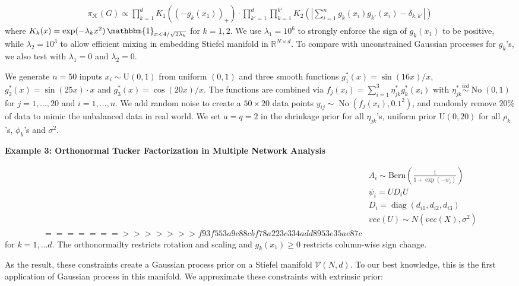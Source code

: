 \documentclass[10pt]{article}
\newcommand{\mc}[1]{\mathcal{#1}}
\DeclareMathOperator{\No}{No}
\DeclareMathOperator{\diag}{diag}
\DeclareMathOperator{\1}{\mathbbm{1}}
\begin{document}
 \begin{equation*}
\begin{aligned}
\pi_{\mc K}(G) \propto   \prod_{k=1}^{d} K_{1}{\left((-g_k(x_1) )_+\right)} \cdot \prod_{k'=1}^{d}\prod_{k=1}^{k'} K_2 ( |\sum_{i=1}^n g_k(x_i) g_{k'}(x_i) - \delta_{k,k'}|)
\end{aligned}
\end{equation*}
where $K_{k}(x)=\exp(- \lambda_k x^2) \1_{x<4/\sqrt{2\lambda_k}}$ for  $k=1,2$. We use $\lambda_1 = 10^6$ to strongly enforce the sign of $g_k(x_1)$ to be positive, while $\lambda_2 = 10^3$ to allow efficient mixing in embedding Stiefel manifold in $\mathbb{R}^{N\times d}$. To compare with unconstrained Gaussian processes for $g_k$'s, we also test with $\lambda_1=0$ and $\lambda_2=0$.

We generate $n=50$ inputs $x_i\sim \text{U}(0,1)$ from uniform $(0,1)$ and three smooth functions $g^*_1(x)= \sin(16 x)/x$, $g^*_2(x)= \sin(25 x)\cdot x$ and $g^*_3(x)= \cos(20 x)/x$. The functions are combined via $f_j(x_i)=\sum_{i=1}^3 \eta^*_{jk} g^*_k(x_i)$ with $\eta^*_{jk}\stackrel{iid}{\sim} \No(0,1)$ for $j=1,\ldots,20$ and $i=1,\ldots,n$. We add random noise to create a $50\times 20$ data points $y_{ij} \sim \No(f_j(x_i),0.1^2)$, and randomly remove $20\%$ of data to mimic the unbalanced data in real world. We set $a=q=2$ in the shrinkage prior for all $\eta_{jk}$'s, uniform prior $\text{U}(0,20)$ for all $\rho_k$'s, $\phi_k$'s and $\sigma^2$.

{\bf Example 3: Orthonormal Tucker Factorization in Multiple Network Analysis}


 \begin{equation*}
\begin{aligned}
& A_i \sim \text{Bern}( \frac{1}{1+ \exp(- \psi_i)})\\
& \psi_i = UD_iU \\
& D_i = \diag(d_{i1},d_{i2},d_{i3}) \\
& vec(U) \sim N (vec (X), \sigma^2)\\
=======
>>>>>>> f93f553a9c88cbf78a223c334add8953e35ae87c
\end{aligned}
\end{equation*}
for $k=1,\ldots d$. The orthonormailty restricts rotation and scaling and $g_k(x_1)\ge 0$ restricts column-wise sign change. 

As the result, these constraints create a Gaussian process prior on a Stiefel manifold $\mc V(N,d)$. To our best knowledge, this is the first application of Gaussian process in this manifold. We approximate these constraints with extrinsic prior:
\end{document}

